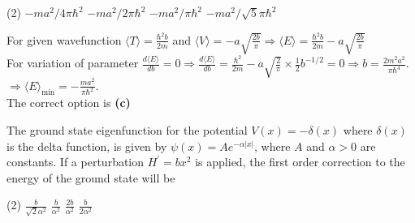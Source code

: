 \begin{enumerate}
\begin{minipage}{\textwidth}
\end{minipage}
\begin{tasks}(2)
	\task[\textbf{A.}] $-m a^{2} / 4 \pi \hbar^{2}$
	\task[\textbf{B.}]$-m a^{2} / 2 \pi \hbar^{2}$
	\task[\textbf{C.}]$-m a^{2} / \pi \hbar^{2}$
	\task[\textbf{D.}]$-m a^{2} / \sqrt{5} \pi \hbar^{2}$
\end{tasks}
\begin{answer}
	For given wavefunction $\langle T\rangle=\frac{\hbar^{2} b}{2 m}$ and $\langle V\rangle=-a \sqrt{\frac{2 b}{\pi}} \Rightarrow\langle E\rangle=\frac{\hbar^{2} b}{2 m}-a \sqrt{\frac{2 b}{\pi}}$\\
	For variation of parameter $\frac{d\langle E\rangle}{d b}=0 \Rightarrow \frac{d\langle E\rangle}{d b}=\frac{\hbar^{2}}{2 m}-a \sqrt{\frac{2}{\pi}} \times \frac{1}{2} b^{-1 / 2}=0 \Rightarrow b=\frac{2 m^{2} a^{2}}{\pi \hbar^{4}}$.\\ $\Rightarrow\langle E\rangle_{\min }=-\frac{m a^{2}}{\pi \hbar^{2}} .$\\
	The correct option is \textbf{(c)}
\end{answer}
\begin{minipage}{\textwidth}
	\item The ground state eigenfunction for the potential $V(x)=-\delta(x)$ where $\delta(x)$ is the delta function, is given by $\psi(x)=A e^{-\alpha|x|}$, where $A$ and $\alpha>0$ are constants. If a perturbation $H^{\prime}=b x^{2}$ is applied, the first order correction to the energy of the ground state will be
\end{minipage}
\begin{tasks}(2)
	\task[\textbf{A.}] $\frac{b}{\sqrt{2} \alpha^{2}}$ 
	\task[\textbf{B.}]$\frac{b}{\alpha^{2}}$
	\task[\textbf{C.}]$\frac{2 b}{\alpha^{2}}$
	\task[\textbf{D.}]$\frac{b}{2 \alpha^{2}}$
\end{tasks}
\end{enumerate}

